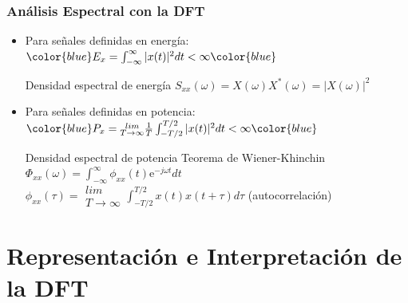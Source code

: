 \documentclass{beamer}
\numberwithin{section}{part}
\begin{document}
\begin{frame}
    \frametitle{Análisis Espectral con la DFT}
  \begin{itemize}
    \item {\small Para señales definidas en energía: $\color{blue}E_x = \int_{-\infty}^{\infty}|x(t)|^2dt<\infty\color{blue}$}
    \begin{alertblock}{\centering Densidad espectral de energía}
      \vspace{0.2cm}
      \centering $S_{xx}(\omega)=X(\omega)X^*(\omega)=|X(\omega)|^2$ \\ \vspace{0.2cm}
    \end{alertblock}  
    \item {\small Para señales definidas en potencia: $\color{blue}P_x = \substack{lim\\T\rightarrow\infty}\frac{1}{T}\int_{-T/2}^{T/2}|x(t)|^2dt<\infty\color{blue}$}
    \begin{alertblock}{\centering Densidad espectral de potencia}
      Teorema de Wiener-Khinchin \\
      \centering $\Phi_{xx}(\omega)=\int_{-\infty}^{\infty}\phi_{xx}(t)\text{e}^{-j\omega t}dt$ \\ \vspace{0.2cm}
      $\phi_{xx}(\tau)=\substack{lim\\T\rightarrow\infty}\int_{-T/2}^{T/2}x(t)x(t+\tau)d\tau$ (autocorrelación) \\ \vspace{0.2cm}
    \end{alertblock}  
    \end{itemize}
  
\end{frame}    


\section{Representación e Interpretación de la DFT}


\end{document}
